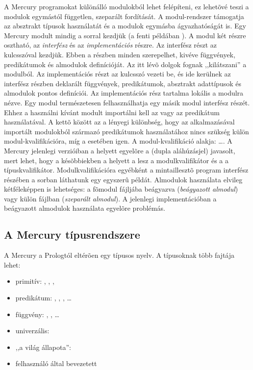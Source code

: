 A Mercury programokat különálló modulokból lehet felépíteni, ez lehetõvé teszi a
modulok egymástól független, szeparált fordítását. A modul-rendszer támogatja az
absztrakt típusok használatát és a modulok egymásba ágyazhatóságát is.
\br
Egy Mercury modult mindig a   sorral kezdjük
(a fenti példában ). A modul két részre osztható, az
\emph{interfész} és az \emph{implementációs} részre. Az interfész részt az
 kulcsszóval kezdjük. Ebben a részben minden szerepelhet, kivéve
függvények, predikátumok és almodulok definícióját. Az itt lévõ dolgok fognak
,,kilátszani'' a modulból. Az implementációs részt az  kulcsszó
vezeti be, és ide kerülnek az interfész részben deklarált függvények, predikátumok,
absztrakt adattípusok és almodulok pontos definíciói. Az implementációs rész tartalma
lokális a modulra nézve.
\br
Egy modul természetesen felhasználhatja egy másik modul interfész részét. Ehhez
a használni kívánt modult importálni kell az  
vagy az   predikátum használatával. A kettõ
között az a lényegi különbség, hogy az  alkalmazásával importált
modulokból származó predikátumok használatához nincs szükség külön modul-kvalifikációra,
míg a  esetében igen. A modul-kvalifikáció alakja:
\cd{:}\cd{:}\dots\cd{:}\cd{:}.
A Mercury jelenlegi verzióiban a \cd{:} helyett egyelõre a \cd{\_\_} (dupla aláhúzásjel)
javasolt, mert lehet, hogy a késõbbiekben a \cd{:} helyett a  lesz a
modulkvalifikátor és a \cd{:} a típuskvalifikátor. Modulkvalifikációra egyébként a
mintaillesztõ program interfész részében a
 sorban láthatunk egy egyszerû példát.
\br
Almodulok használata elvileg kétféleképpen is lehetséges: a fõmodul fájljába beágyazva
(\emph{beágyazott almodul}) vagy külön fájlban (\emph{szeparált almodul}). A jelenlegi
implementációban a beágyazott almodulok használata egyelõre problémás.

\subsection{A Mercury típusrendszere}

A Mercury a Prologtól eltérõen egy típusos nyelv. A típusoknak több fajtája lehet:

\begin{itemize}
\item primitív: , , , 
\item predikátum: , , , \dots
\item függvény: , , \dots
\item univerzális: 
\item ,,a világ állapota'': 
\item felhasználó által bevezetett
\end{itemize}

